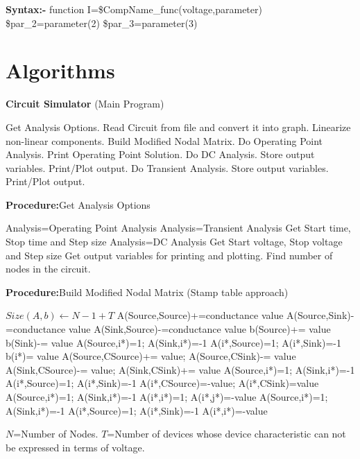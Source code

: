 \documentclass[a4paper,10pt]{report}
\begin{document}
{\bf Syntax:-}
\newline 
function I=\$CompName\_func(voltage,parameter)
\$par\_2=parameter(2)
\$par\_3=parameter(3)

\chapter*{Algorithms}
{\bf Circuit Simulator} (Main Program)
\small
\begin{algorithmic}[1]
\STATE Get Analysis Options.
\STATE Read Circuit from file and convert it into graph.
\STATE Linearize non-linear components.
\STATE Build Modified Nodal Matrix.
\STATE Do Operating Point Analysis.
\STATE Print Operating Point Solution.
\STATE Do DC Analysis.
\STATE Store output variables.
\ENDFOR
\STATE Print/Plot output.
\ENDIF
{}
\STATE Do Transient Analysis.
\STATE Store output variables.
\ENDFOR
\STATE Print/Plot output.
\ENDIF
\end{algorithmic}
\normalsize

{\bf Procedure:}{Get Analysis Options}
\small
\begin{algorithmic}[1]
\STATE Analysis=Operating Point Analysis
\ENDIF
{}
\STATE Analysis=Transient Analysis
\STATE Get Start time, Stop time and Step size 
\ENDIF
{}
\STATE Analysis=DC Analysis
\STATE Get Start voltage, Stop voltage and Step size 
\ENDIF
\STATE Get output variables for printing and plotting.
\STATE Find number of nodes in the circuit.
\end{algorithmic}

{\bf Procedure:}{Build Modified Nodal Matrix (Stamp table approach)}
\small
\begin{algorithmic}[1]
\STATE $Size(A,b) \gets N-1+T$
\STATE A(Source,Source)+=conductance value
\STATE A(Source,Sink)-=conductance value
\STATE A(Sink,Source)-=conductance value
\ENDIF
{}
\STATE b(Source)+= value
\STATE b(Sink)-= value
\ENDIF
{}
\STATE A(Source,i*)=1; A(Sink,i*)=-1
\STATE A(i*,Source)=1; A(i*,Sink)=-1
\STATE b(i*)= value
\ENDIF
{}
\STATE A(Source,CSource)+= value; A(Source,CSink)-= value
\STATE A(Sink,CSource)-= value; A(Sink,CSink)+= value
\ENDIF
{}
\STATE A(Source,i*)=1; A(Sink,i*)=-1
\STATE A(i*,Source)=1; A(i*,Sink)=-1
\STATE A(i*,CSource)=-value; A(i*,CSink)=value
\ENDIF
{}
\STATE A(Source,i*)=1; A(Sink,i*)=-1
\STATE A(i*,i*)=1; A(i*,j*)=-value
\ENDIF
{}
\STATE A(Source,i*)=1; A(Sink,i*)=-1
\STATE A(i*,Source)=1; A(i*,Sink)=-1
\STATE A(i*,i*)=-value
\ENDIF
\ENDFOR
\end{algorithmic}
$N$=Number of Nodes.\newline
$T$=Number of devices whose device characteristic can not be expressed in terms of voltage.
\normalsize
\newline
\end{document}
